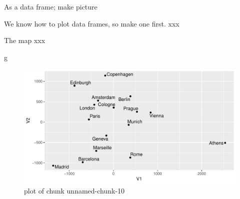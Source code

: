 \documentclass[ignorenonframetext,]{beamer}
\newenvironment{Shaded}{\begin{snugshade}}{\end{snugshade}}
\newcommand{\DataTypeTok}[1]{\textcolor[rgb]{0.13,0.29,0.53}{#1}}
\newcommand{\KeywordTok}[1]{\textcolor[rgb]{0.13,0.29,0.53}{\textbf{#1}}}
\newcommand{\NormalTok}[1]{#1}
\newcommand{\OperatorTok}[1]{\textcolor[rgb]{0.81,0.36,0.00}{\textbf{#1}}}
\newcommand{\StringTok}[1]{\textcolor[rgb]{0.31,0.60,0.02}{#1}}
\begin{document}
\begin{frame}[fragile]{As a data frame; make picture}
\protect\hypertarget{as-a-data-frame-make-picture}{}

We know how to plot data frames, so make one first. xxx

\normalsize

\begin{Shaded}
\end{Shaded}

\normalsize

\end{frame}

\begin{frame}[fragile]{The map xxx}
\protect\hypertarget{the-map-xxx}{}

\begin{Shaded}
\begin{Highlighting}[]
\NormalTok{g}
\end{Highlighting}
\end{Shaded}

\begin{figure}
\centering
\includegraphics{figure/unnamed-chunk-10-1.pdf}
\caption{plot of chunk unnamed-chunk-10}
\end{figure}

\end{frame}
\end{document}
